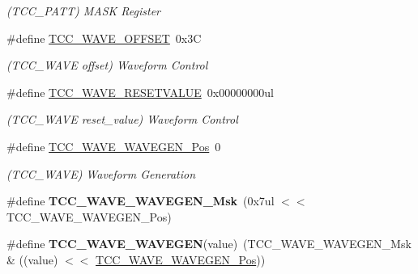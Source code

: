 \begin{DoxyCompactItemize}
\begin{DoxyCompactList}\small\item\em (T\+C\+C\+\_\+\+P\+A\+T\+T) M\+A\+S\+K Register \end{DoxyCompactList}\item 
\hypertarget{group___s_a_m_l21___t_c_c_ga0b014ba4d1c838d1cb212d3bfddb8472}{}\#define \hyperlink{group___s_a_m_l21___t_c_c_ga0b014ba4d1c838d1cb212d3bfddb8472}{T\+C\+C\+\_\+\+W\+A\+V\+E\+\_\+\+O\+F\+F\+S\+E\+T}~0x3\+C\label{group___s_a_m_l21___t_c_c_ga0b014ba4d1c838d1cb212d3bfddb8472}

\begin{DoxyCompactList}\small\item\em (T\+C\+C\+\_\+\+W\+A\+V\+E offset) Waveform Control \end{DoxyCompactList}\item 
\hypertarget{group___s_a_m_l21___t_c_c_ga12fe187c1bd7475217810236cdf5b9da}{}\#define \hyperlink{group___s_a_m_l21___t_c_c_ga12fe187c1bd7475217810236cdf5b9da}{T\+C\+C\+\_\+\+W\+A\+V\+E\+\_\+\+R\+E\+S\+E\+T\+V\+A\+L\+U\+E}~0x00000000ul\label{group___s_a_m_l21___t_c_c_ga12fe187c1bd7475217810236cdf5b9da}

\begin{DoxyCompactList}\small\item\em (T\+C\+C\+\_\+\+W\+A\+V\+E reset\+\_\+value) Waveform Control \end{DoxyCompactList}\item 
\hypertarget{group___s_a_m_l21___t_c_c_gabc932c28cfac8cdd585de6664d7665e2}{}\#define \hyperlink{group___s_a_m_l21___t_c_c_gabc932c28cfac8cdd585de6664d7665e2}{T\+C\+C\+\_\+\+W\+A\+V\+E\+\_\+\+W\+A\+V\+E\+G\+E\+N\+\_\+\+Pos}~0\label{group___s_a_m_l21___t_c_c_gabc932c28cfac8cdd585de6664d7665e2}

\begin{DoxyCompactList}\small\item\em (T\+C\+C\+\_\+\+W\+A\+V\+E) Waveform Generation \end{DoxyCompactList}\item 
\hypertarget{group___s_a_m_l21___t_c_c_gac29948f0dec004623a3aae8ed65a6c27}{}\#define {\bfseries T\+C\+C\+\_\+\+W\+A\+V\+E\+\_\+\+W\+A\+V\+E\+G\+E\+N\+\_\+\+Msk}~(0x7ul $<$$<$ T\+C\+C\+\_\+\+W\+A\+V\+E\+\_\+\+W\+A\+V\+E\+G\+E\+N\+\_\+\+Pos)\label{group___s_a_m_l21___t_c_c_gac29948f0dec004623a3aae8ed65a6c27}

\item 
\hypertarget{group___s_a_m_l21___t_c_c_gafd99fc46a559fb7f778977671a4d328a}{}\#define {\bfseries T\+C\+C\+\_\+\+W\+A\+V\+E\+\_\+\+W\+A\+V\+E\+G\+E\+N}(value)~(T\+C\+C\+\_\+\+W\+A\+V\+E\+\_\+\+W\+A\+V\+E\+G\+E\+N\+\_\+\+Msk \& ((value) $<$$<$ \hyperlink{group___s_a_m_l21___t_c_c_gabc932c28cfac8cdd585de6664d7665e2}{T\+C\+C\+\_\+\+W\+A\+V\+E\+\_\+\+W\+A\+V\+E\+G\+E\+N\+\_\+\+Pos}))\label{group___s_a_m_l21___t_c_c_gafd99fc46a559fb7f778977671a4d328a}


\end{DoxyCompactItemize}
